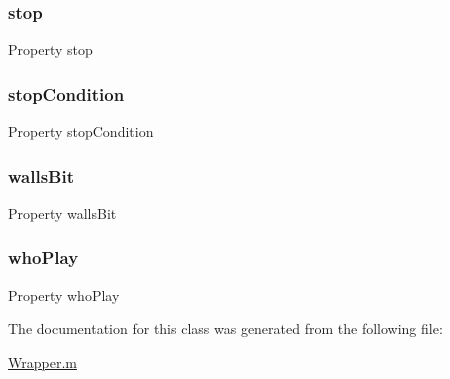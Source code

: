 \subsubsection{\texorpdfstring{stop}{stop}}
{\footnotesize\ttfamily Property stop}

\mbox{\label{class_wrapper_a19a246dc459b20945f02106d6734fa4b}} 
\subsubsection{\texorpdfstring{stop\+Condition}{stopCondition}}
{\footnotesize\ttfamily Property stop\+Condition}

\mbox{\label{class_wrapper_a94dd71be012b98d496117309a20939b1}} 
\subsubsection{\texorpdfstring{walls\+Bit}{wallsBit}}
{\footnotesize\ttfamily Property walls\+Bit}

\mbox{\label{class_wrapper_a19e8c1d68257003eba8e5a47c8302113}} 
\subsubsection{\texorpdfstring{who\+Play}{whoPlay}}
{\footnotesize\ttfamily Property who\+Play}



The documentation for this class was generated from the following file\+:\begin{DoxyCompactItemize}
\item 
\hyperlink{_wrapper_8m}{Wrapper.\+m}\end{DoxyCompactItemize}
